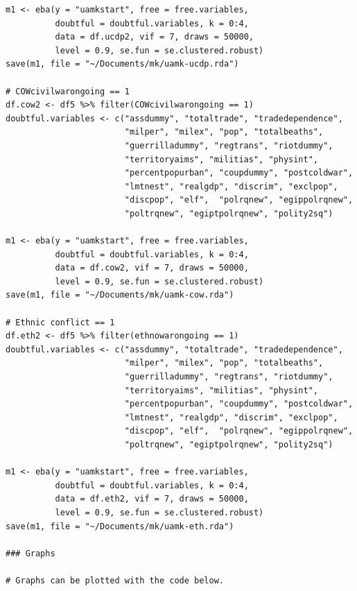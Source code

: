 \documentclass[a4paper,12pt]{article}
\begin{document}
\begin{verbatim}
m1 <- eba(y = "uamkstart", free = free.variables,
          doubtful = doubtful.variables, k = 0:4,
          data = df.ucdp2, vif = 7, draws = 50000,
          level = 0.9, se.fun = se.clustered.robust)
save(m1, file = "~/Documents/mk/uamk-ucdp.rda")

# COWcivilwarongoing == 1
df.cow2 <- df5 %>% filter(COWcivilwarongoing == 1)
doubtful.variables <- c("assdummy", "totaltrade", "tradedependence",
                        "milper", "milex", "pop", "totalbeaths",
                        "guerrilladummy", "regtrans", "riotdummy",
                        "territoryaims", "militias", "physint",
                        "percentpopurban", "coupdummy", "postcoldwar",
                        "lmtnest", "realgdp", "discrim", "exclpop",
                        "discpop", "elf",  "polrqnew", "egippolrqnew",
                        "poltrqnew", "egiptpolrqnew", "polity2sq")

m1 <- eba(y = "uamkstart", free = free.variables,
          doubtful = doubtful.variables, k = 0:4,
          data = df.cow2, vif = 7, draws = 50000,
          level = 0.9, se.fun = se.clustered.robust)
save(m1, file = "~/Documents/mk/uamk-cow.rda")

# Ethnic conflict == 1
df.eth2 <- df5 %>% filter(ethnowarongoing == 1)
doubtful.variables <- c("assdummy", "totaltrade", "tradedependence",
                        "milper", "milex", "pop", "totalbeaths",
                        "guerrilladummy", "regtrans", "riotdummy",
                        "territoryaims", "militias", "physint",
                        "percentpopurban", "coupdummy", "postcoldwar",
                        "lmtnest", "realgdp", "discrim", "exclpop", 
                        "discpop", "elf",  "polrqnew", "egippolrqnew",
                        "poltrqnew", "egiptpolrqnew", "polity2sq")

m1 <- eba(y = "uamkstart", free = free.variables,
          doubtful = doubtful.variables, k = 0:4,
          data = df.eth2, vif = 7, draws = 50000,
          level = 0.9, se.fun = se.clustered.robust)
save(m1, file = "~/Documents/mk/uamk-eth.rda")

### Graphs

# Graphs can be plotted with the code below. 


\end{verbatim}
\end{document}
